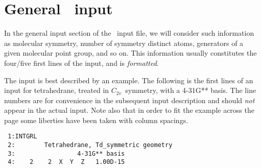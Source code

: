 \section{General \mol\ input}\label{sec:molgeneral}

In the general input section of the \mol\ input file, we will consider
such information as molecular symmetry, number of
symmetry distinct atoms, generators of a
given molecular point group, and so on. 
This information usually constitutes the four/five first lines of the
input, and is {\em formatted}.

The input is best described by an example.
The following is the first lines of an input for
tetrahedrane, treated in 
$C_{2v}$~symmetry, with a 4-31G** basis.  The line numbers are for
convenience in the subsequent input description and should {\em
not} appear in the actual input.  Note also that in order to fit
the example across the page some liberties have been taken with
column spacings.
\begin{verbatim}
 1:INTGRL
 2:        Tetrahedrane, Td_symmetric geometry
 3:                 4-31G** basis
 4:    2    2  X  Y  Z   1.00D-15
\end{verbatim}

